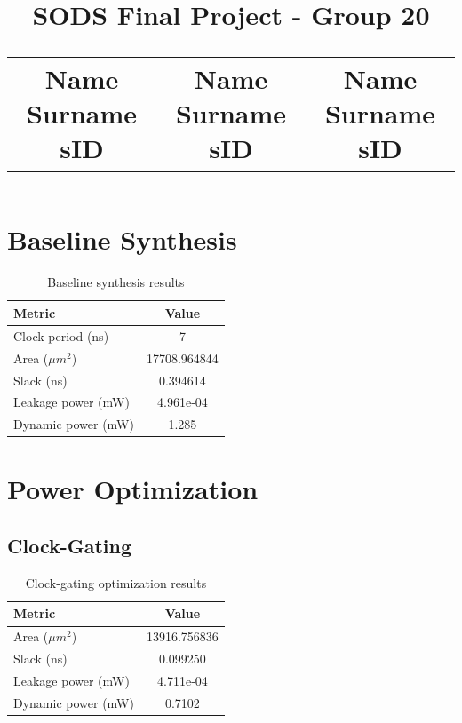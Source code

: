 \documentclass[11pt,a4paper]{article}
\title{
    \textbf{SODS Final Project - Group 20}\\[0.5em]
    \large
    \begin{tabular}{ccc}
        Name Surname sID & Name Surname sID & Name Surname sID
    \end{tabular}
}
\begin{document}
\date{}

\maketitle
\vspace{-2cm}
\section{Baseline Synthesis}

\begin{table}[h]
\centering
\caption{Baseline synthesis results}
\begin{tabular}{lc}
\toprule
\textbf{Metric} & \textbf{Value} \\
\midrule
Clock period (ns) & 7 \\
Area ($\mu m^2$) & 17708.964844 \\
Slack (ns) & 0.394614 \\
Leakage power (mW) & 4.961e-04 \\
Dynamic power (mW) & 1.285 \\
\bottomrule
\end{tabular}
\end{table}

\section{Power Optimization}

\subsection{Clock-Gating}

\begin{table}[h]
\centering
\caption{Clock-gating optimization results}
\begin{tabular}{lc}
\toprule
\textbf{Metric} & \textbf{Value} \\
\midrule
Area ($\mu m^2$) & 13916.756836 \\
Slack (ns) & 0.099250 \\
Leakage power (mW) & 4.711e-04 \\
Dynamic power (mW) & 0.7102 \\
\bottomrule
\end{tabular}
\end{table}
\end{document}
